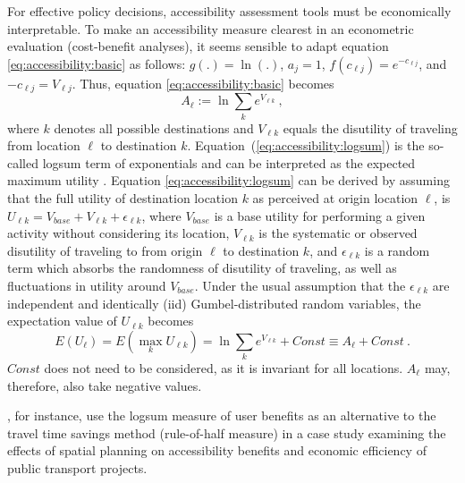 For effective policy decisions, accessibility assessment tools must be economically interpretable.
To make an accessibility measure clearest in an econometric evaluation (\eg cost-benefit 
analyses), it seems sensible to adapt equation \ref{eq:accessibility:basic} as 
follows: $g(.) = \ln(.)$, $a_j = 1$, $f(c_{\ell j}) = e^{-c_{\ell j}}$, and $-c_{\ell j} = V_{\ell j}$. Thus, 
equation \ref{eq:accessibility:basic} becomes
\begin{equation}
	A_\ell := \ln \sum_k e^{V_{\ell k}} \ ,
	\label{eq:accessibility:logsum}
\end{equation}
where $k$ denotes all possible destinations and $V_{\ell k}$ equals the disutility of traveling from location $\ell$
to destination $k$. Equation~(\ref{eq:accessibility:logsum}) is the so-called \gls{logsum} term of exponentials and can be interpreted
as the expected maximum utility \citep[e.g.,][]{BenAkivaLerman_1985, DejongEtc2005LogsumAsEvalDutchReport}. Equation
\ref{eq:accessibility:logsum} can be derived by assuming that the full utility of destination location $k$ as
perceived at origin location $\ell$, is $U_{\ell k} = V_{base} + V_{\ell k} + \epsilon_{\ell k}$,
where $V_{base}$ is a base utility for performing a given activity without considering its location,
$V_{\ell k}$ is the systematic or observed disutility of traveling to from origin $\ell$ to destination $k$,
and $\epsilon_{\ell k}$ is a random term which absorbs the randomness of disutility of traveling, as well as
fluctuations in utility around $V_{base}$. Under the usual assumption that the $\epsilon_{\ell k}$ are
independent and identically (iid) Gumbel-distributed random variables, the expectation value of $U_{\ell k}$ becomes
\begin{equation}
	E(U_\ell) = E(\max_k U_{\ell k}) = \ln \sum_k e^{V_{\ell k}} + Const \equiv A_\ell + Const \ .
\end{equation}
$Const$ does not need to be considered, as it is invariant for all locations. $A_\ell$ may, therefore, also
take negative values.

\citet{GeursEtAl2012AccessibilityBenefitsNetherlands}, for instance, use the \gls{logsum} measure of user benefits 
as an alternative to the travel time savings method (\ie rule-of-half measure) in a case study 
examining the effects of spatial planning on accessibility benefits and economic efficiency of public 
transport projects.

